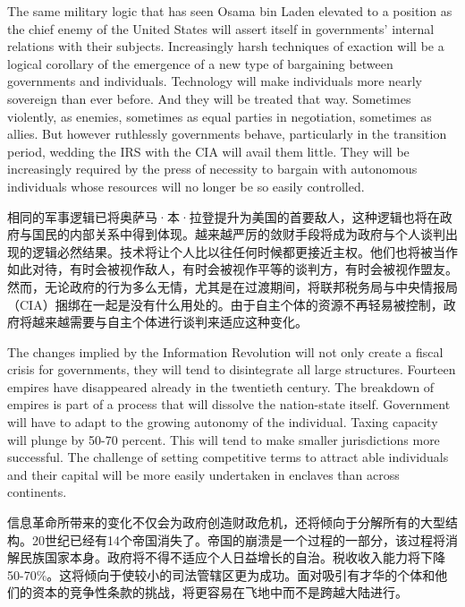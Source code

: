 \begin{Parallel}{97mm}{45mm}
  \ParallelPar  

  \ParallelLText
  {The same military logic that has seen Osama bin Laden elevated to a position as the chief enemy of the United States will assert itself in governments' internal relations with their subjects. Increasingly harsh techniques of exaction will be a logical corollary of the emergence of a new type of bargaining between governments and individuals. Technology will make individuals more nearly sovereign than ever before. And they will be treated that way. Sometimes violently, as enemies, sometimes as equal parties in negotiation, sometimes as allies. But however ruthlessly governments behave, particularly in the transition period, wedding the IRS with the CIA will avail them little. They will be increasingly required by the press of necessity to bargain with autonomous individuals whose resources will no longer be so easily controlled.  }
  
  \ParallelRText
  {\small 相同的军事逻辑已将奥萨马·本·拉登提升为美国的首要敌人，这种逻辑也将在政府与国民的内部关系中得到体现。越来越严厉的敛财手段将成为政府与个人谈判出现的逻辑必然结果。技术将让个人比以往任何时候都更接近主权。他们也将被当作如此对待，有时会被视作敌人，有时会被视作平等的谈判方，有时会被视作盟友。然而，无论政府的行为多么无情，尤其是在过渡期间，将联邦税务局与中央情报局（CIA）捆绑在一起是没有什么用处的。由于自主个体的资源不再轻易被控制，政府将越来越需要与自主个体进行谈判来适应这种变化。}


  \ParallelPar  

  \ParallelLText
  {The changes implied by the Information Revolution will not only create a fiscal crisis for governments, they will tend to disintegrate all large structures. Fourteen empires have disappeared already in the twentieth century. The breakdown of empires is part of a process that will dissolve the nation-state itself. Government will have to adapt to the growing autonomy of the individual. Taxing capacity will plunge by 50-70 percent. This will tend to make smaller jurisdictions more successful. The challenge of setting competitive terms to attract able individuals and their capital will be more easily undertaken in enclaves than across continents.}
  
  \ParallelRText
  {\small 信息革命所带来的变化不仅会为政府创造财政危机，还将倾向于分解所有的大型结构。20世纪已经有14个帝国消失了。帝国的崩溃是一个过程的一部分，该过程将消解民族国家本身。政府将不得不适应个人日益增长的自治。税收收入能力将下降50-70\%。这将倾向于使较小的司法管辖区更为成功。面对吸引有才华的个体和他们的资本的竞争性条款的挑战，将更容易在飞地中而不是跨越大陆进行。 }



\end{Parallel}

